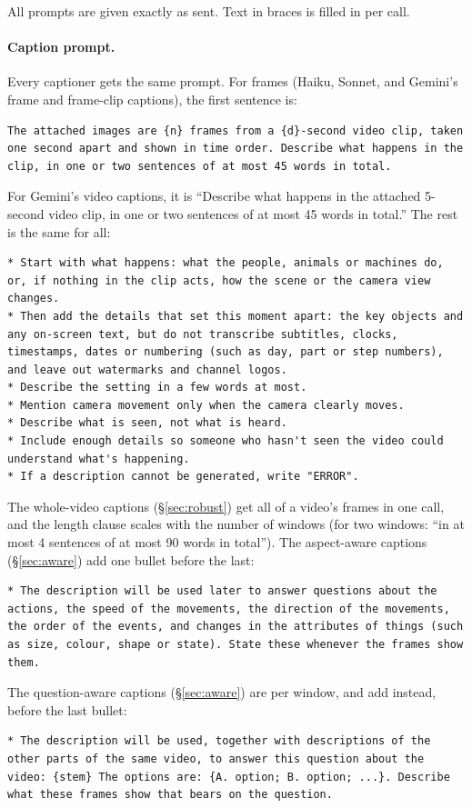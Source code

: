 \documentclass[11pt]{article}
\begin{document}
All prompts are given exactly as sent. Text in braces is filled in per call.

\paragraph{Caption prompt.} Every captioner gets the same prompt. For frames (Haiku, Sonnet, and Gemini's frame and frame-clip captions), the first sentence is:
\begin{lstlisting}
The attached images are {n} frames from a {d}-second video clip, taken one second apart and shown in time order. Describe what happens in the clip, in one or two sentences of at most 45 words in total.
\end{lstlisting}
For Gemini's video captions, it is ``Describe what happens in the attached 5-second video clip, in one or two sentences of at most 45 words in total.'' The rest is the same for all:
\begin{lstlisting}
* Start with what happens: what the people, animals or machines do, or, if nothing in the clip acts, how the scene or the camera view changes.
* Then add the details that set this moment apart: the key objects and any on-screen text, but do not transcribe subtitles, clocks, timestamps, dates or numbering (such as day, part or step numbers), and leave out watermarks and channel logos.
* Describe the setting in a few words at most.
* Mention camera movement only when the camera clearly moves.
* Describe what is seen, not what is heard.
* Include enough details so someone who hasn't seen the video could understand what's happening.
* If a description cannot be generated, write "ERROR".
\end{lstlisting}
The whole-video captions (\S\ref{sec:robust}) get all of a video's frames in one call, and the length clause scales with the number of windows (for two windows: ``in at most 4 sentences of at most 90 words in total''). The aspect-aware captions (\S\ref{sec:aware}) add one bullet before the last:
\begin{lstlisting}
* The description will be used later to answer questions about the actions, the speed of the movements, the direction of the movements, the order of the events, and changes in the attributes of things (such as size, colour, shape or state). State these whenever the frames show them.
\end{lstlisting}
The question-aware captions (\S\ref{sec:aware}) are per window, and add instead, before the last bullet:
\begin{lstlisting}
* The description will be used, together with descriptions of the other parts of the same video, to answer this question about the video: {stem} The options are: {A. option; B. option; ...}. Describe what these frames show that bears on the question.
\end{lstlisting}
\end{document}
